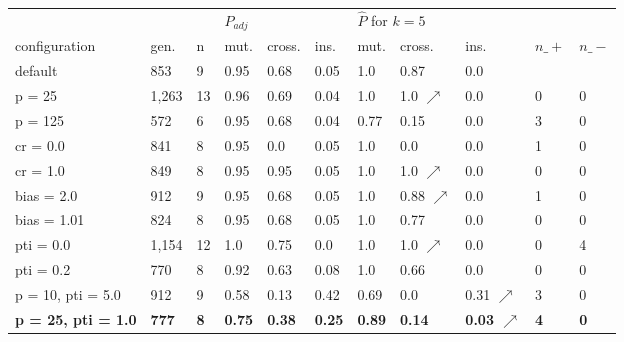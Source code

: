 \begin{tabular}{lll|lll|lll|ll}
\hline
                           &              &            & \multicolumn{3}{l|}{$P_{adj}$}                & \multicolumn{3}{l|}{$\hat{P}$ for $k = 5$}                 &            &            \\
configuration              & gen.         & n          & mut.          & cross.        & ins.          & mut.          & cross.          & ins.                     & $n\_+$       & $n\_-$       \\ \hline
default                    & 853          & 9          & 0.95          & 0.68          & 0.05          & 1.0           & 0.87            & 0.0                      &          &          \\
p = 25                     & 1,263        & 13         & 0.96          & 0.69          & 0.04          & 1.0           & 1.0 $\nearrow$  & 0.0                      & 0          & 0          \\
p = 125                    & 572          & 6          & 0.95          & 0.68          & 0.04          & 0.77          & 0.15            & 0.0                      & 3          & 0          \\
cr = 0.0                   & 841          & 8          & 0.95          & 0.0           & 0.05          & 1.0           & 0.0             & 0.0                      & 1          & 0          \\
cr = 1.0                   & 849          & 8          & 0.95          & 0.95          & 0.05          & 1.0           & 1.0 $\nearrow$  & 0.0                      & 0          & 0          \\
bias = 2.0                 & 912          & 9          & 0.95          & 0.68          & 0.05          & 1.0           & 0.88 $\nearrow$ & 0.0                      & 1          & 0          \\
bias = 1.01                & 824          & 8          & 0.95          & 0.68          & 0.05          & 1.0           & 0.77            & 0.0                      & 0          & 0          \\
pti = 0.0                  & 1,154        & 12         & 1.0           & 0.75          & 0.0           & 1.0           & 1.0 $\nearrow$  & 0.0                      & 0          & 4          \\
pti = 0.2                  & 770          & 8          & 0.92          & 0.63          & 0.08          & 1.0           & 0.66            & 0.0                      & 0          & 0          \\
p = 10, pti = 5.0          & 912          & 9          & 0.58          & 0.13          & 0.42          & 0.69          & 0.0             & 0.31 $\nearrow$          & 3          & 0          \\
\textbf{p = 25, pti = 1.0} & \textbf{777} & \textbf{8} & \textbf{0.75} & \textbf{0.38} & \textbf{0.25} & \textbf{0.89} & \textbf{0.14}   & \textbf{0.03 $\nearrow$} & \textbf{4} & \textbf{0} \\ \hline
\end{tabular}